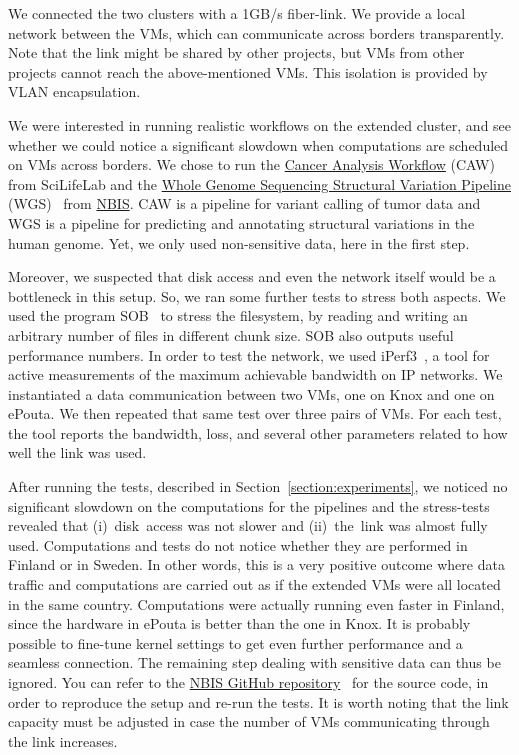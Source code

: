 We connected the two clusters with a 1GB/s fiber-link. We provide a
local network between the VMs, which can communicate across borders
transparently.
%
Note that the link might be shared by other projects, but VMs from
other projects cannot reach the above-mentioned VMs.
%
This isolation is provided by VLAN encapsulation.


We were interested in running realistic workflows on the extended
cluster, and see whether we could notice a significant slowdown when
computations are scheduled on VMs across borders.
%
We chose to run the \href{https://github.com/SciLifeLab/CAW}{Cancer
  Analysis Workflow} (CAW)~\cite{caw} from SciLifeLab and the
\href{https://github.com/NBISweden/wgs-structvar}{Whole Genome
  Sequencing Structural Variation Pipeline} (WGS)~\cite{caw} from
\href{http://www.nbis.se}{NBIS}.
%
CAW is a pipeline for variant calling of tumor data and WGS is a
pipeline for predicting and annotating structural variations in the
human genome.
%
Yet, we only used non-sensitive data, here in the first step.

Moreover, we suspected that disk access and even the network itself
would be a bottleneck in this setup. So, we ran some further tests to
stress both aspects.
%
We used the program SOB~\cite{sob} to stress the filesystem, by
reading and writing an arbitrary number of files in different chunk
size. SOB also outputs useful performance numbers.
%
In order to test the network, we used iPerf3~\cite{iperf}, a tool for
active measurements of the maximum achievable bandwidth on IP
networks.
%
We instantiated a data communication between two VMs, one on Knox and
one on ePouta.
%
We then repeated that same test over three pairs of VMs.
%
For each test, the tool reports the bandwidth, loss, and several other
parameters related to how well the link was used.


After running the tests, described in
Section~\ref{section:experiments}, we noticed no significant slowdown
on the computations for the pipelines and the stress-tests revealed
that (i)~disk~access was not slower and (ii)~the~link was almost fully
used.
%
Computations and tests do not notice whether they are performed in
Finland or in Sweden.
%
In other words, this is a very positive outcome where data traffic and
computations are carried out as if the extended VMs were all located
in the same country.
%
Computations were actually running
even faster in Finland, since the hardware in ePouta is better than
the one in Knox.
%
It is probably possible to fine-tune kernel settings
to get even further performance and a seamless connection.
%
The remaining step dealing with sensitive data can thus be ignored.
%
You can refer to the
\href{https://github.com/NBISweden/Knox-ePouta}{NBIS GitHub
  repository}~\cite{nbis-knox-epouta} for the source code, in order to
reproduce the setup and re-run the tests.
%
It is worth noting that the link capacity must be adjusted in case the
number of VMs communicating through the link increases.
